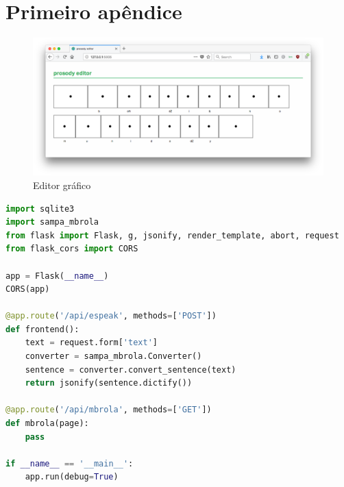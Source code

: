 \apendice
\chapter{Primeiro apêndice}

\begin{figure}
  \centering
    \includegraphics[width=1\textwidth]{Imagens/editor.png}
  \caption{Editor gráfico}
\end{figure}

\begin{lstlisting}[caption=Servidor, label=servidor, language=Python]
import sqlite3
import sampa_mbrola
from flask import Flask, g, jsonify, render_template, abort, request
from flask_cors import CORS

app = Flask(__name__)
CORS(app)

@app.route('/api/espeak', methods=['POST'])
def frontend():
    text = request.form['text']
    converter = sampa_mbrola.Converter()
    sentence = converter.convert_sentence(text)
    return jsonify(sentence.dictify())

@app.route('/api/mbrola', methods=['GET'])
def mbrola(page):
    pass

if __name__ == '__main__':
    app.run(debug=True)
\end{lstlisting}

